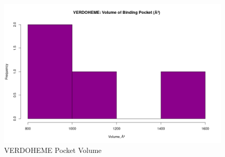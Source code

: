 	
	\begin{figure}
		\caption{VERDOHEME Pocket Volume}
		\label{figs:VERDOHEME_volume}
		\includegraphics[width=\linewidth]{7A/VERDOHEME_volume}
	\end{figure}
	



